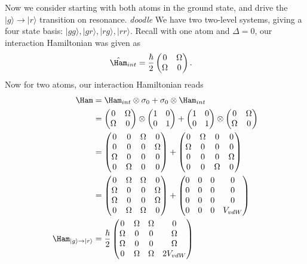 \documentclass[lasers.tex]{subfiles}
\begin{document}
Now we consider starting with both atoms in the ground state, and drive the $|g\rangle\to|r\rangle$ transition on resonance. 
\emph{doodle}
We have two two-level systems, giving a four state basis: $|gg\rangle,|gr\rangle,|rg\rangle,|rr\rangle$.
Recall with one atom and $\Delta=0$, our interaction Hamiltonian was given as
\begin{align}
    \hat{\Ham}_{int} &= \frac{\hbar}{2}\begin{pmatrix} 0 & \Omega \\ \Omega & 0\end{pmatrix}.
\end{align}
Now for two atoms, our interaction Hamiltonian reads
\begin{align}
    \Ham &= \Ham_{int}\otimes\sigma_0 + \sigma_0\otimes\Ham_{int} \\
         &= \begin{pmatrix}0 & \Omega \\ \Omega & 0\end{pmatrix}\otimes\begin{pmatrix}1&0\\0&1\end{pmatrix} + \begin{pmatrix}1&0\\0&1\end{pmatrix} \otimes\begin{pmatrix}0&\Omega\\\Omega&0\end{pmatrix} \\
         &= \begin{pmatrix} 0&0&\Omega&0\\0&0&0&\Omega\\\Omega&0&0&0\\0&\Omega&0&0\end{pmatrix} + \begin{pmatrix} 0&\Omega&0&0\\\Omega&0&0&0\\0&0&0&\Omega\\0&0&\Omega&0\end{pmatrix} \\
         &= \begin{pmatrix} 0&\Omega&\Omega&0\\\Omega&0&0&\Omega\\\Omega&0&0&\Omega\\0&\Omega&\Omega&0\end{pmatrix} + \begin{pmatrix}0&0&0&0\\0&0&0&0\\0&0&0&0\\0&0&0&V_{vdW}\end{pmatrix} \\
    \Ham_{|g\rangle\to|r\rangle} &= \frac{\hbar}{2}\begin{pmatrix} 0&\Omega&\Omega&0\\\Omega&0&0&\Omega\\\Omega&0&0&\Omega\\0&\Omega&\Omega&2V_{vdW}\end{pmatrix}
\end{align}
\end{document}
